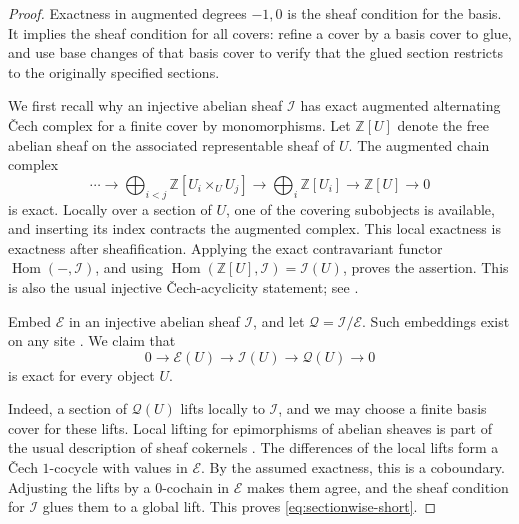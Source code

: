 \documentclass[11pt]{article}
\theoremstyle{definition}
\theoremstyle{remark}
\DeclareMathOperator{\Hom}{Hom}
\begin{document}
\begin{proof}
Exactness in augmented degrees \(-1,0\) is the sheaf condition
for the basis. It implies the sheaf condition for all covers:
refine a cover by a basis cover to glue, and use base changes of
that basis cover to verify that the glued section restricts to
the originally specified sections.

We first recall why an injective abelian sheaf \(\mathcal I\)
has exact augmented alternating \v{C}ech complex for a finite
cover by monomorphisms. Let \(\mathbb Z[U]\) denote the free
abelian sheaf on the associated representable sheaf of \(U\).
The augmented chain complex
\[
\cdots\longrightarrow
\bigoplus_{i<j}\mathbb Z[U_i\times_U U_j]
\longrightarrow
\bigoplus_i\mathbb Z[U_i]
\longrightarrow \mathbb Z[U]\longrightarrow0
\]
is exact. Locally over a section of \(U\), one of the covering
subobjects is available, and inserting its index contracts the
augmented complex. This local exactness is exactness after
sheafification. Applying the exact contravariant functor
\(\Hom(-,\mathcal I)\), and using
\(\Hom(\mathbb Z[U],\mathcal I)=\mathcal I(U)\), proves the
assertion. This is also the usual injective \v{C}ech-acyclicity
statement; see \cite[Tag~03AW]{Stacks}.

Embed \(\mathcal E\) in an injective abelian sheaf \(\mathcal I\),
and let \(\mathcal Q=\mathcal I/\mathcal E\).
Such embeddings exist on any site
\cite[Tag~01DP]{Stacks}.
We claim that
\begin{equation}\label{eq:sectionwise-short}
0\longrightarrow\mathcal E(U)\longrightarrow\mathcal I(U)
\longrightarrow\mathcal Q(U)\longrightarrow0
\end{equation}
is exact for every object \(U\).

Indeed, a section of \(\mathcal Q(U)\) lifts locally to
\(\mathcal I\), and we may choose a finite basis cover for these
lifts. Local lifting for epimorphisms of abelian sheaves is part
of the usual description of sheaf cokernels
\cite[Tag~03CM]{Stacks}.
The differences of the local lifts form a \v{C}ech \(1\)-cocycle
with values in \(\mathcal E\). By the assumed exactness, this is a
coboundary. Adjusting the lifts by a \(0\)-cochain in
\(\mathcal E\) makes them agree, and the sheaf condition for
\(\mathcal I\) glues them to a global lift. This proves
\eqref{eq:sectionwise-short}.


\end{proof}
\end{document}
